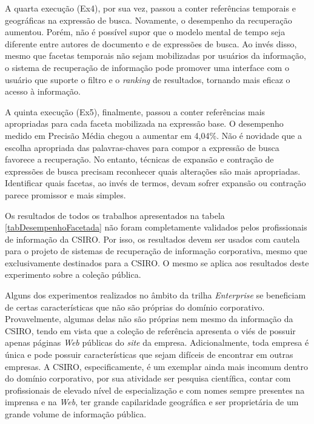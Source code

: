 A quarta execução (Ex4), por sua vez, passou a conter referências temporais e geográficas na expressão de busca. Novamente, o desempenho da recuperação aumentou. Porém, não é possível supor que o modelo mental de tempo seja diferente entre autores de documento e de expressões de busca. Ao invés disso, mesmo que facetas temporais não sejam mobilizadas por usuários da informação, o sistema de recuperação de informação pode promover uma interface com o usuário que suporte o filtro e o \textit{ranking} de resultados, tornando mais eficaz o acesso à informação.

A quinta execução (Ex5), finalmente, passou a conter referências mais apropriadas para cada faceta mobilizada na expressão base. O desempenho medido em Precisão Média chegou a aumentar em 4,04\%. Não é novidade que a escolha apropriada das palavras-chaves para compor a expressão de busca favorece a recuperação. No entanto, técnicas de expansão e contração de expressões de busca precisam reconhecer quais alterações são mais apropriadas. Identificar quais facetas, ao invés de termos, devam sofrer expansão ou contração parece promissor e mais simples.

Os resultados de todos os trabalhos apresentados na tabela \ref{tabDesempenhoFacetada} não foram completamente validados pelos profissionais de informação da CSIRO. Por isso, os resultados devem ser usados com cautela para o projeto de sistemas de recuperação de informação corporativa, mesmo que exclusivamente destinados para a CSIRO. O mesmo se aplica aos resultados deste experimento sobre a coleção pública.

Alguns dos experimentos realizados no âmbito da trilha \textit{Enterprise} se beneficiam de certas características que não são próprias do domínio corporativo. Provavelmente, algumas delas não são próprias nem mesmo da informação da CSIRO, tendo em vista que a coleção de referência apresenta o viés de possuir apenas páginas \textit{Web} públicas do \textit{site} da empresa. Adicionalmente, toda empresa é única e pode possuir características que sejam difíceis de encontrar em outras empresas. A CSIRO, especificamente, é um exemplar ainda mais incomum dentro do domínio corporativo, por sua atividade ser pesquisa científica, contar com profissionais de elevado nível de especialização e com nomes sempre presentes na imprensa e na \textit{Web}, ter grande capilaridade geográfica e ser proprietária de um grande volume de informação pública.

